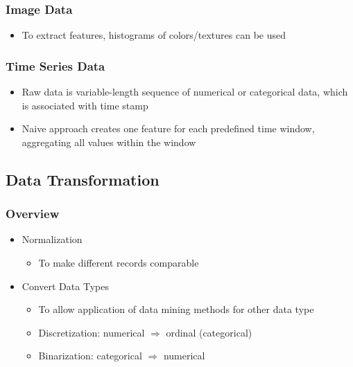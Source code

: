 \documentclass[../notes.tex]{subfiles}
\begin{document}
\subsubsection{Image Data}
\begin{itemize}
  \item To extract features, histograms of colors/textures can be used
\end{itemize}

\subsubsection{Time Series Data}
\begin{itemize}
  \item Raw data is variable-length sequence of numerical or categorical data, which is associated with time stamp
  \item Naive approach creates one feature for each predefined time window, aggregating all values within the window
\end{itemize}

\subsection{Data Transformation}
\subsubsection{Overview}
\begin{itemize}
  \item Normalization
  \begin{itemize}
    \item To make different records comparable
  \end{itemize}

  \item Convert Data Types
  \begin{itemize}
    \item To allow application of data mining methods for other data type
    \item Discretization: numerical $\Rightarrow$ ordinal (categorical)
    \item Binarization: categorical $\Rightarrow$ numerical
  \end{itemize}
\end{itemize}
\end{document}
